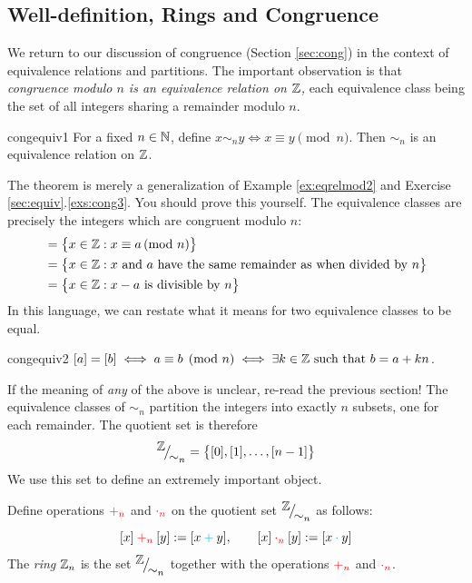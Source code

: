 \clearpage


\subsection{Well-definition, Rings and Congruence}\label{sec:welldefn}

We return to our discussion of congruence (Section \ref{sec:cong}) in the context of equivalence relations and partitions. The important observation is that \emph{congruence modulo $n$ is an equivalence relation on $\mathbb{Z}$,} each equivalence class being the set of all integers sharing a remainder modulo $n$.

\begin{thm}{}{congequiv1}
	For a fixed $n\in\mathbb{N}$, define $x\sim_n y\iff x\equiv y\pmod n$. Then $\sim_n$ is an equivalence relation on $\mathbb{Z}$.
\end{thm}

The theorem is merely a generalization of Example \ref{ex:eqrelmod2} and Exercise \ref*{sec:equiv}.\ref{exs:cong3}. You should prove this yourself. The equivalence classes are precisely the integers which are congruent modulo $n$:
\begin{align*}
	[a]&=\bigl\{x\in\Z:x\equiv a\spmod n\bigr\}\\
	&=\bigl\{x\in\Z:x\text{ and $a$ have the same remainder as when divided by $n$}\bigr\}\\
	&=\bigl\{x\in\Z:x-a\text{ is divisible by $n$}\bigr\}
\end{align*}
In this language, we can restate what it means for two equivalence classes to be equal.

\begin{lemm}{}{congequiv2}
	$[a]=[b]\iff a\equiv b\pmod n\iff \exists k\in\mathbb{Z}\text{ such that }b=a+kn$.
\end{lemm}

If the meaning of \emph{any} of the above is unclear, re-read the previous section! The equivalence classes of $\sim_n$ partition the integers  into  exactly $n$ subsets, one for each remainder. The quotient set is therefore
\[
	{}^{\textstyle {\mathbb{Z}}}\!\big/_{\textstyle \!{\sim_n}}=\bigl\{[0],[1],\ldots,[n-1]\bigr\}
\]
We use this set to define an extremely important object.

\begin{defn}{}{}
	Define operations $\textcolor{red}{+_n}$ and $\textcolor{red}{\cdot_n}$ on the quotient set ${}^{\textstyle {\mathbb{Z}}}\!\big/_{\textstyle \!{\sim_n}}$ as follows:
	\[
		[x]\mathbin{\textcolor{red}{+_n}}[y]:=[x\mathbin{\textcolor{cyan}{+}}y],\qquad [x]\mathbin{\textcolor{red}{\cdot_n}}[y]:=[x\mathbin{\textcolor{cyan}{\cdot}} y]
	\]
	The \emph{ring} $\mathbb{Z}_n$ is the set ${}^{\textstyle {\mathbb{Z}}}\!\big/_{\textstyle \!{\sim_n}}$ together with the operations $\textcolor{red}{+_n}$ and $\textcolor{red}{\cdot_n}$.
\end{defn}

